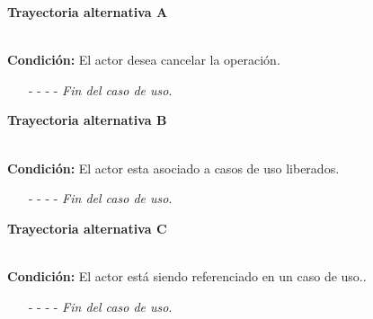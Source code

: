 \hypertarget{CU10-3:TAA}{\textbf{Trayectoria alternativa A}}\\
\noindent \textbf{Condición:} El actor desea cancelar la operación.
\begin{enumerate}
	\UCpaso[\UCactor] Oprime el botón  de la pantalla emergente.
	\UCpaso[\UCsist] Muestra la pantalla .
	\item[- -] - - {\em {Fin del caso de uso}}.%
\end{enumerate}	
\hypertarget{CU10-3:TAB}{\textbf{Trayectoria alternativa B}}\\
\noindent \textbf{Condición:} El actor esta asociado a casos de uso liberados.
\begin{enumerate}
	\UCpaso[\UCsist] Oculta el botón \eliminar del actor que esta asociado a casos de uso liberados.
	\item[- -] - - {\em {Fin del caso de uso}}.
\end{enumerate}
\hypertarget{CU10-3:TAC}{\textbf{Trayectoria alternativa C}}\\
\noindent \textbf{Condición:} El actor está siendo referenciado en un caso de uso..
\begin{enumerate}
	\UCpaso[\UCsist] Muestra el mensaje  en la pantalla .
	\item[- -] - - {\em {Fin del caso de uso}}.
\end{enumerate}
